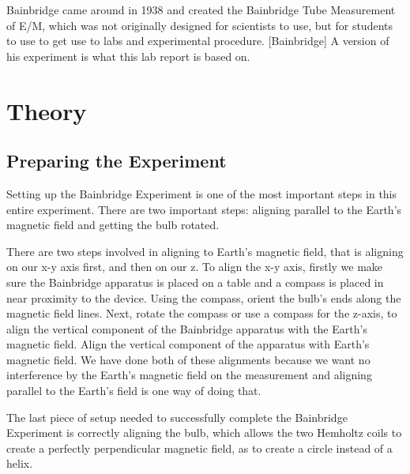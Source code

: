 \documentclass[aps,prl,10pt,twocolumn,floatfix]{revtex4-2}
\begin{document}
Bainbridge came around in 1938 and created the Bainbridge Tube Measurement of E/M, which was not originally designed for scientists to use, but for students to use to get use to labs and experimental procedure. [Bainbridge]
A version of his experiment is what this lab report is based on.


\section{Theory}\label{Theory}

\subsection{Preparing the Experiment}
Setting up the Bainbridge Experiment is one of the most important steps in this entire experiment.
There are two important steps: aligning parallel to the Earth's magnetic field and getting the bulb rotated.

There are two steps involved in aligning to Earth's magnetic field, that is aligning on our x-y axis first, and then on our z.
To align the x-y axis, firstly we make sure the Bainbridge apparatus is placed on a table and a compass is placed in near proximity to the device.
Using the compass, orient the bulb's ends along the magnetic field lines.
Next, rotate the compass or use a compass for the z-axis, to align the vertical component of the Bainbridge apparatus with the Earth's magnetic field.
Align the vertical component of the apparatus with Earth's magnetic field.
We have done both of these alignments because we want no interference by the Earth's magnetic field on the measurement and aligning parallel to the Earth's field is one way of doing that.

The last piece of setup needed to successfully complete the Bainbridge Experiment is correctly aligning the bulb, which allows the two Hemholtz coils to create a perfectly perpendicular magnetic field, as to create a circle instead of a helix.
\end{document}
